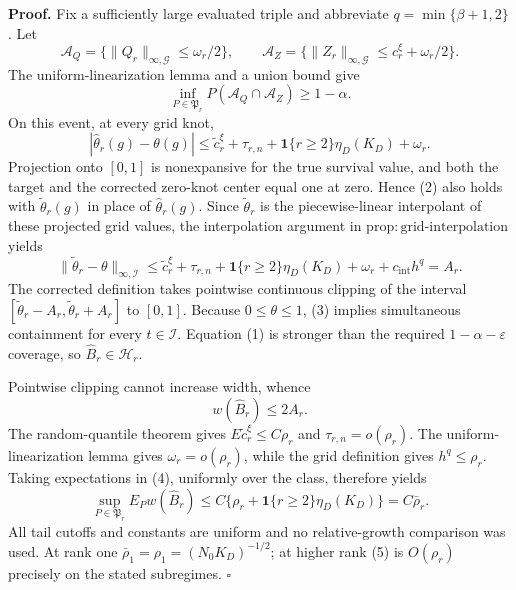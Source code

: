 \textbf{Proof.}
Fix a sufficiently large evaluated triple and abbreviate \(q=\min\{\beta+1,2\}\).  Let
\[
 \mathcal A_Q=\{\|Q_r\|_{\infty,\mathcal G}\le\omega_r/2\},
 \qquad
 \mathcal A_Z=\{\|Z_r\|_{\infty,\mathcal G}\le c_r^\xi+\omega_r/2\}.
\]
The uniform-linearization lemma and a union bound give
\[
 \inf_{P\in\mathfrak P_r}P(\mathcal A_Q\cap\mathcal A_Z)
 \ge1-\alpha.                                           \tag{1}
\]
On this event, at every grid knot,
\[
 |\widehat\theta_r(g)-\theta(g)|
 \le \widetilde c_r^\xi+\tau_{r,n}
 +\mathbf1\{r\ge2\}\eta_D(K_D)+\omega_r.              \tag{2}
\]
Projection onto \([0,1]\) is nonexpansive for the true survival value, and both the target and the corrected zero-knot center equal one at zero.  Hence (2) also holds with \(\widetilde\theta_r(g)\) in place of \(\widehat\theta_r(g)\).  Since \(\widetilde\theta_r\) is the piecewise-linear interpolant of these projected grid values, the interpolation argument in \(\mathrm{prop:grid\mbox{-}interpolation}\) yields
\[
 \|\widetilde\theta_r-\theta\|_{\infty,\mathcal I}
 \le \widetilde c_r^\xi+\tau_{r,n}
 +\mathbf1\{r\ge2\}\eta_D(K_D)+\omega_r
 +c_{\mathrm{int}}h^q=A_r.                              \tag{3}
\]
The corrected definition takes pointwise continuous clipping of the interval \([\widetilde\theta_r-A_r,\widetilde\theta_r+A_r]\) to \([0,1]\).  Because \(0\le\theta\le1\), (3) implies simultaneous containment for every \(t\in\mathcal I\).  Equation (1) is stronger than the required \(1-\alpha-\varepsilon\) coverage, so \(\widehat B_r\in\mathcal H_r\).

Pointwise clipping cannot increase width, whence
\[
 w(\widehat B_r)\le2A_r.                                \tag{4}
\]
The random-quantile theorem gives \(E\widetilde c_r^\xi\le C\rho_r\) and \(\tau_{r,n}=o(\rho_r)\).  The uniform-linearization lemma gives \(\omega_r=o(\rho_r)\), while the grid definition gives \(h^q\le\rho_r\).  Taking expectations in (4), uniformly over the class, therefore yields
\[
 \sup_{P\in\mathfrak P_r}E_Pw(\widehat B_r)
 \le C\{\rho_r+\mathbf1\{r\ge2\}\eta_D(K_D)\}
 =C\bar\rho_r.                                         \tag{5}
\]
All tail cutoffs and constants are uniform and no relative-growth comparison was used.  At rank one \(\bar\rho_1=\rho_1=(N_0K_D)^{-1/2}\); at higher rank (5) is \(O(\rho_r)\) precisely on the stated subregimes. \(\square\)